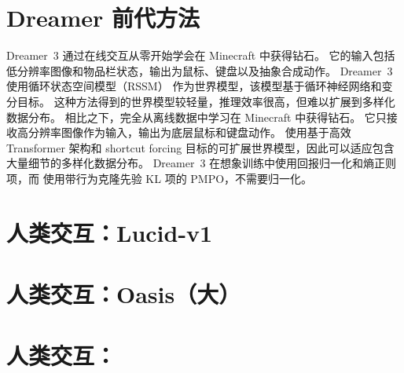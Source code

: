 \section{Dreamer 前代方法}
\vspace*{-1ex}
Dreamer~3\citep{dreamerv3} 通过在线交互从零开始学会在 Minecraft 中获得钻石。
它的输入包括低分辨率图像和物品栏状态，输出为鼠标、键盘以及抽象合成动作。
Dreamer~3 使用循环状态空间模型（RSSM）\citep{hafner2018planet} 作为世界模型，该模型基于循环神经网络和变分目标。
这种方法得到的世界模型较轻量，推理效率很高，但难以扩展到多样化数据分布。
相比之下，\method 完全从离线数据中学习在 Minecraft 中获得钻石。
它只接收高分辨率图像作为输入，输出为底层鼠标和键盘动作。
\method 使用基于高效 Transformer 架构和 shortcut forcing 目标的可扩展世界模型，因此可以适应包含大量细节的多样化数据分布。
Dreamer~3 在想象训练中使用回报归一化和熵正则项，而 \method 使用带行为克隆先验 KL 项的 PMPO，不需要归一化。
\vspace*{1ex}

\clearpage

\enlargethispage{\baselineskip}
\vspace*{-10ex}
\section{人类交互：Lucid-v1}
\vspace*{-2ex}

\vspace*{-2ex}
\clearpage

\enlargethispage{\baselineskip}
\vspace*{-10ex}
\section{人类交互：Oasis（大）}
\vspace*{-2ex}

\vspace*{-2ex}
\clearpage

\enlargethispage{\baselineskip}
\vspace*{-10ex}
\section{人类交互：\method}
\vspace*{-2ex}

\clearpage
